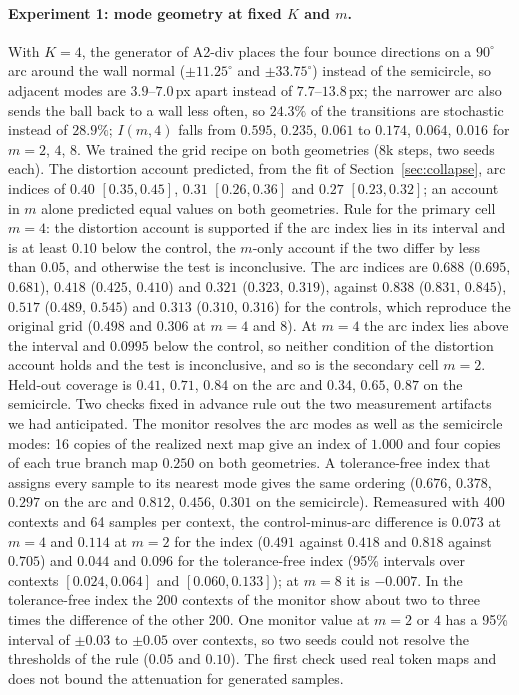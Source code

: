 \paragraph{Experiment 1: mode geometry at fixed $K$ and $m$.} With $K{=}4$, the generator of A2-div places the four bounce directions on a $90^\circ$ arc around the wall normal ($\pm11.25^\circ$ and $\pm33.75^\circ$) instead of the semicircle, so adjacent modes are $3.9$--$7.0$\,px apart instead of $7.7$--$13.8$\,px; the narrower arc also sends the ball back to a wall less often, so $24.3\%$ of the transitions are stochastic instead of $28.9\%$; $I(m,4)$ falls from $0.595$, $0.235$, $0.061$ to $0.174$, $0.064$, $0.016$ for $m = 2$, $4$, $8$. We trained the grid recipe on both geometries (8k steps, two seeds each). The distortion account predicted, from the fit of Section~\ref{sec:collapse}, arc indices of $0.40$ $[0.35, 0.45]$, $0.31$ $[0.26, 0.36]$ and $0.27$ $[0.23, 0.32]$; an account in $m$ alone predicted equal values on both geometries. Rule for the primary cell $m{=}4$: the distortion account is supported if the arc index lies in its interval and is at least $0.10$ below the control, the $m$-only account if the two differ by less than $0.05$, and otherwise the test is inconclusive. The arc indices are $0.688$ ($0.695$, $0.681$), $0.418$ ($0.425$, $0.410$) and $0.321$ ($0.323$, $0.319$), against $0.838$ ($0.831$, $0.845$), $0.517$ ($0.489$, $0.545$) and $0.313$ ($0.310$, $0.316$) for the controls, which reproduce the original grid ($0.498$ and $0.306$ at $m = 4$ and $8$). At $m{=}4$ the arc index lies above the interval and $0.0995$ below the control, so neither condition of the distortion account holds and the test is inconclusive, and so is the secondary cell $m{=}2$. Held-out coverage is $0.41$, $0.71$, $0.84$ on the arc and $0.34$, $0.65$, $0.87$ on the semicircle. Two checks fixed in advance rule out the two measurement artifacts we had anticipated. The monitor resolves the arc modes as well as the semicircle modes: 16 copies of the realized next map give an index of $1.000$ and four copies of each true branch map $0.250$ on both geometries. A tolerance-free index that assigns every sample to its nearest mode gives the same ordering ($0.676$, $0.378$, $0.297$ on the arc and $0.812$, $0.456$, $0.301$ on the semicircle). Remeasured with 400 contexts and 64 samples per context, the control-minus-arc difference is $0.073$ at $m{=}4$ and $0.114$ at $m{=}2$ for the index ($0.491$ against $0.418$ and $0.818$ against $0.705$) and $0.044$ and $0.096$ for the tolerance-free index (95\% intervals over contexts $[0.024, 0.064]$ and $[0.060, 0.133]$); at $m{=}8$ it is $-0.007$. In the tolerance-free index the 200 contexts of the monitor show about two to three times the difference of the other 200. One monitor value at $m = 2$ or $4$ has a 95\% interval of $\pm0.03$ to $\pm0.05$ over contexts, so two seeds could not resolve the thresholds of the rule ($0.05$ and $0.10$). The first check used real token maps and does not bound the attenuation for generated samples.

